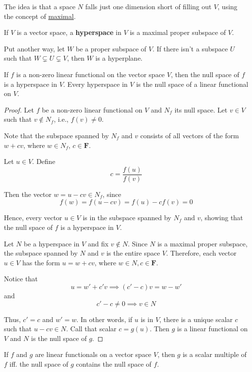 The idea is that a space $N$ falls just one dimension short of filling out $V$, using the concept of \hyperref[def:maximal]{maximal}.

\begin{definition}[Hyperspace]
	If $V$ is a vector space, a \textbf{hyperspace} in $V$ is a maximal proper subspace of $V$.
\end{definition}

Put another way, let $W$ be a proper subspace of $V$. If there isn't a subspace $U$ such that $W \subsetneq U \subsetneq V$, then $W$ is a hyperplane.

\begin{theorem}
	If $f$ is a non-zero linear functional on the vector space $V$, then the null space of $f$ is a hyperspace in $V$. Every hyperspace in $V$ is the null space of a linear functional on $V$.
\end{theorem}

\begin{proof}
	Let $f$ be a non-zero linear functional on $V$ and $N_f$ its null space. Let $v \in V$ such that $v \notin N_f$, i.e., $f(v) \neq 0$.

	Note that the subspace spanned by $N_f$ and $v$ consists of all vectors of the form $w + cv$, where $w \in N_f$, $c \in \textbf{F}$.

	Let $u \in V$. Define 
	\[
		c = \frac{f(u)}{f(v)}
	\]

	Then the vector $w = u - cv \in N_f$, since
	\[
		f(w) = f(u - cv) = f(u) - cf(v) = 0
	\]
	
	Hence, every vector $u \in V$ is in the subspace spanned by $N_f$ and $v$, showing that the null space of $f$ is a hyperspace in $V$.

	Let $N$ be a hyperspace in $V$ and fix $v \notin N$. Since $N$ is a maximal proper subspace, the subspace spanned by $N$ and $v$ is the entire space $V$. Therefore, each vector $u \in V$ has the form $u = w + cv$, where $w \in N, c \in \textbf{F}$.

	Notice that
	\[
		u = w' + c'v \implies (c'-c)v = w - w'
	\]
	and
	\[
		c' - c \neq 0 \implies v \in N
	\]	
	
	Thus, $c' = c$ and $w' = w$. In other words, if $u$ is in $V$, there is a unique scalar $c$ such that $u - cv \in N$. Call that scalar $c = g(u)$. Then $g$ is a linear functional on $V$ and $N$ is the null space of $g$.
\end{proof}

\begin{lemma}
	If $f$ and $g$ are linear functionals on a vector space $V$, then $g$ is a scalar multiple of $f$ iff. the null space of $g$ contains the null space of $f$.
\end{lemma}

